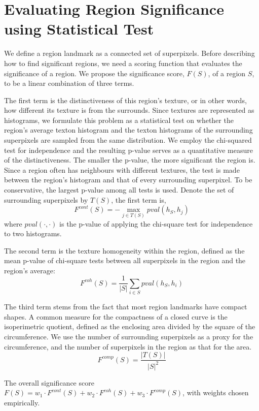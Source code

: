 \documentclass{llncs}
\begin{document}

\section{Evaluating Region Significance using Statistical Test}

We define a region landmark as a connected set of superpixels. Before describing how to find significant regions, we need a scoring function that evaluates the significance of a region. We propose the significance score, $F(S)$, of a region $S$, to be a linear combination of three terms. 

The first term is the distinctiveness of this region's texture, or in other words, how different its texture is from the surrounds. Since textures are represented as histograms, we formulate this problem as a statistical test on whether the region's average texton histogram and the texton histograms of the surrounding superpixels are sampled from the same distribution. We employ the chi-squared test for independence and the resulting p-value serves as a quantitative measure of the distinctiveness. The smaller the p-value, the more significant the region is. Since a region often has neighbours with different textures, the test is made between the region's histogram and that of every surrounding superpixel. To be conservative, the largest p-value among all tests is used. Denote the set of surrounding superpixels by $T(S)$, the first term is,
$$F^{cont}(S) = - \max_{j\in T(S)} pval(h_S, h_j)$$
where $pval(\cdot,\cdot)$ is the p-value of applying the chi-square test for independence to two histograms.

The second term is the texture homogeneity within the region, defined as the mean p-value of chi-square tests between all superpixels in the region and the region's average:
$$F^{coh}(S) = \frac{1}{|S|} \sum_{i\in S} pval(h_S, h_i)$$

The third term stems from the fact that most region landmarks have compact shapes. A common measure for the compactness of a closed curve is the isoperimetric quotient, defined as the enclosing area divided by the square of the circumference. We use the number of surrounding superpixels as a proxy for the circumference, and the number of superpixels in the region as that for the area. 
$$F^{comp}(S) = \frac{|T(S)|}{|S|^2}$$

The overall significance score $F(S) = w_1 \cdot F^{cont}(S) + w_2 \cdot F^{coh}(S) + w_3 \cdot F^{comp}(S)$, with weights chosen empirically.
\end{document}
